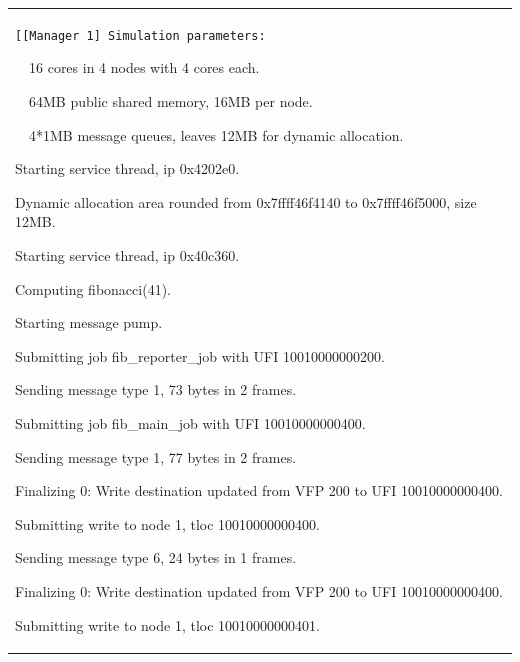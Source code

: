 \documentclass[a4paper]{article}
\begin{document}
\begin{flushleft}
\tablehead{}
\begin{supertabular}{|m{6.4018598in}|}
\hline
{ \texttt{[[Manager 1] Simulation parameters:}}

{\ttfamily [Manager 1] \ \ 16 cores in 4 nodes
with 4 cores each.}

{\ttfamily [Manager 1] \ \ 64MB public shared
memory, 16MB per node.}

{\ttfamily [Manager 1] \ \ 4*1MB message queues,
leaves 12MB for dynamic allocation.}

{\ttfamily [Manager 1] Starting service thread,
ip 0x4202e0.}

{\ttfamily [Scheduler 1] Dynamic allocation area
rounded from 0x7ffff46f4140 to 0x7ffff46f5000, size 12MB.}

{\ttfamily [Manager 1] Starting service thread,
ip 0x40c360.}

{\ttfamily [Test] Computing fibonacci(41).}

{\ttfamily [Scheduler 1] Starting message pump.}

{\ttfamily [Scheduler 1] Submitting job
fib\_reporter\_job with UFI 10010000000200.}

{ Sending message type
1, 73 bytes in 2 frames.}

{\ttfamily [Scheduler 1] Submitting job
fib\_main\_job with UFI 10010000000400.}

{ Sending message type
1, 77 bytes in 2 frames.}

{\ttfamily [Scheduler 1] Finalizing 0: Write
destination updated from VFP 200 to UFI 10010000000400.}

{\ttfamily [Scheduler 1] Submitting write to
node 1, tloc 10010000000400.}

{ Sending message type
6, 24 bytes in 1 frames.}

{\ttfamily [Scheduler 1] Finalizing 0: Write
destination updated from VFP 200 to UFI 10010000000400.}

{\ttfamily [Scheduler 1] Submitting write to
node 1, tloc 10010000000401.}


\end{supertabular}
\end{flushleft}
\end{document}
